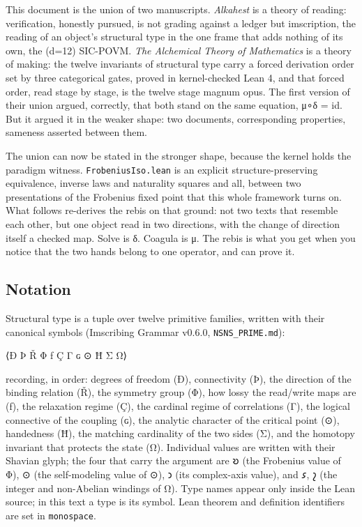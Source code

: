 This document is the union of two manuscripts. \emph{Alkahest} is a
theory of reading: verification, honestly pursued, is not grading
against a ledger but imscription, the reading of an object's structural
type in the one frame that adds nothing of its own, the (d=12) SIC-POVM.
\emph{The Alchemical Theory of Mathematics} is a theory of making: the
twelve invariants of structural type carry a forced derivation order set
by three categorical gates, proved in kernel-checked Lean 4, and that
forced order, read stage by stage, is the twelve stage magnum opus. The
first version of their union argued, correctly, that both stand on the
same equation, μ∘δ = id. But it argued it in the weaker shape: two
documents, corresponding properties, sameness asserted between them.

The union can now be stated in the stronger shape, because the kernel
holds the paradigm witness. \texttt{FrobeniusIso.lean} is an explicit
structure-preserving equivalence, inverse laws and naturality squares
and all, between two presentations of the Frobenius fixed point that
this whole framework turns on. What follows re-derives the rebis on that
ground: not two texts that resemble each other, but one object read in
two directions, with the change of direction itself a checked map. Solve
is δ. Coagula is μ. The rebis is what you get when you notice that the
two hands belong to one operator, and can prove it.

\hypertarget{notation}{%
\subsection{Notation}\label{notation}}

Structural type is a tuple over twelve primitive families, written with
their canonical symbols (Imscribing Grammar v0.6.0,
\texttt{NSNS\_PRIME.md}):

⟨Ð Þ Ř Φ ƒ Ç Γ ɢ ⊙ Ħ Σ Ω⟩

recording, in order: degrees of freedom (Ð), connectivity (Þ), the
direction of the binding relation (Ř), the symmetry group (Φ), how lossy
the read/write maps are (ƒ), the relaxation regime (Ç), the cardinal
regime of correlations (Γ), the logical connective of the coupling (ɢ),
the analytic character of the critical point (⊙), handedness (Ħ), the
matching cardinality of the two sides (Σ), and the homotopy invariant
that protects the state (Ω). Individual values are written with their
Shavian glyph; the four that carry the argument are 𐑹 (the Frobenius
value of Φ), ⊙ (the self-modeling value of ⊙), 𐑮 (its complex-axis
value), and 𐑭, 𐑟 (the integer and non-Abelian windings of Ω). Type names
appear only inside the Lean source; in this text a type is its symbol.
Lean theorem and definition identifiers are set in \texttt{monospace}.

